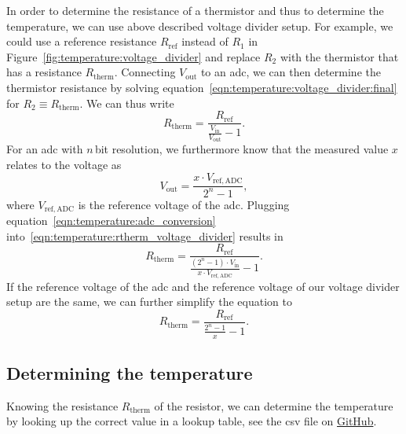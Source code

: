 In order to determine the resistance of a thermistor and thus to determine the temperature, we can use above described voltage divider setup. For example, we could use a reference resistance $R_\mathrm{ref}$ instead of $R_1$ in Figure~\ref{fig:temperature:voltage_divider} and replace $R_2$ with the thermistor that has a resistance $R_\mathrm{therm}$. Connecting $V_\mathrm{out}$ to an \ac{adc}, we can then determine the thermistor resistance by solving equation~\ref{eqn:temperature:voltage_divider:final} for $R_2 \equiv R_\mathrm{therm}$. We can thus write
\begin{equation}
    R_\mathrm{therm} = \frac{R_\mathrm{ref}}{\frac{V_\mathrm{in}}{V_\mathrm{out}} - 1}.
    \label{eqn:temperature:rtherm_voltage_divider}
\end{equation}
For an \ac{adc} with $n$\,bit resolution, we furthermore know that the measured value $x$ relates to the voltage as
\begin{equation}
    V_\mathrm{out} = \frac{x \cdot V_\mathrm{ref,ADC}}{2^{n} - 1},  \label{eqn:temperature:adc_conversion}
\end{equation}
where $V_\mathrm{ref,ADC}$ is the reference voltage of the \ac{adc}. 
Plugging equation~\eqref{eqn:temperature:adc_conversion} into~\eqref{eqn:temperature:rtherm_voltage_divider} results in
\begin{equation}
    R_\mathrm{therm} = \frac{R_\mathrm{ref}}{\frac{(2^{n} - 1) \cdot V_\mathrm{in}}{x\cdot V_\mathrm{ref,ADC}} - 1}.
\end{equation}
If the reference voltage of the \ac{adc} and the reference voltage of our voltage divider setup are the same, we can further simplify the equation to
\begin{equation}
    R_\mathrm{therm} = \frac{R_\mathrm{ref}}{\frac{2^{n} - 1}{x} - 1}.
\end{equation}

\subsection{Determining the temperature}\label{sec:temperature:thermistor:determining_temperature}

Knowing the resistance $R_\mathrm{therm}$ of the resistor, we can determine the temperature by looking up the correct value in a lookup table, see the \ac{csv} file on \href{https://github.com/galactic-forensics/workshop_arduino_electronics/blob/main/figures/03_temperature/thermistor_lookup_table_adafruit_372.csv}{GitHub}.

